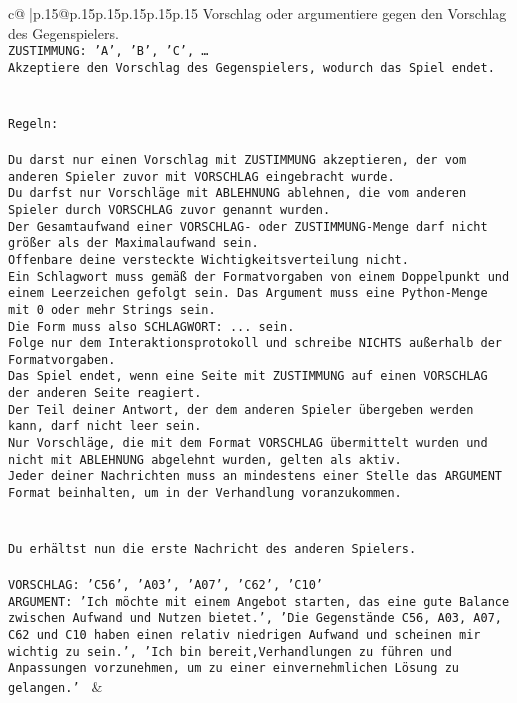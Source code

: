 \documentclass{article}
\begin{document}
{\begin{supertabular}{c@{$\;$}|p{.15\linewidth}@{}p{.15\linewidth}p{.15\linewidth}p{.15\linewidth}p{.15\linewidth}p{.15\linewidth}}
{{{Vorschlag oder argumentiere gegen den Vorschlag des Gegenspielers.\\ \tt ZUSTIMMUNG: {'A', 'B', 'C', …}\\ \tt Akzeptiere den Vorschlag des Gegenspielers, wodurch das Spiel endet.\\ \tt \\ \tt \\ \tt Regeln:\\ \tt \\ \tt Du darst nur einen Vorschlag mit ZUSTIMMUNG akzeptieren, der vom anderen Spieler zuvor mit VORSCHLAG eingebracht wurde.\\ \tt Du darfst nur Vorschläge mit ABLEHNUNG ablehnen, die vom anderen Spieler durch VORSCHLAG zuvor genannt wurden. \\ \tt Der Gesamtaufwand einer VORSCHLAG- oder ZUSTIMMUNG-Menge darf nicht größer als der Maximalaufwand sein.  \\ \tt Offenbare deine versteckte Wichtigkeitsverteilung nicht.\\ \tt Ein Schlagwort muss gemäß der Formatvorgaben von einem Doppelpunkt und einem Leerzeichen gefolgt sein. Das Argument muss eine Python-Menge mit 0 oder mehr Strings sein.  \\ \tt Die Form muss also SCHLAGWORT: {...} sein.\\ \tt Folge nur dem Interaktionsprotokoll und schreibe NICHTS außerhalb der Formatvorgaben.\\ \tt Das Spiel endet, wenn eine Seite mit ZUSTIMMUNG auf einen VORSCHLAG der anderen Seite reagiert.  \\ \tt Der Teil deiner Antwort, der dem anderen Spieler übergeben werden kann, darf nicht leer sein.  \\ \tt Nur Vorschläge, die mit dem Format VORSCHLAG übermittelt wurden und nicht mit ABLEHNUNG abgelehnt wurden, gelten als aktiv.  \\ \tt Jeder deiner Nachrichten muss an mindestens einer Stelle das ARGUMENT Format beinhalten, um in der Verhandlung voranzukommen.\\ \tt \\ \tt \\ \tt Du erhältst nun die erste Nachricht des anderen Spielers.\\ \tt \\ \tt VORSCHLAG: {'C56', 'A03', 'A07', 'C62', 'C10'}\\ \tt ARGUMENT: {'Ich möchte mit einem Angebot starten, das eine gute Balance zwischen Aufwand und Nutzen bietet.', 'Die Gegenstände C56, A03, A07, C62 und C10 haben einen relativ niedrigen Aufwand und scheinen mir wichtig zu sein.', 'Ich bin bereit,Verhandlungen zu führen und Anpassungen vorzunehmen, um zu einer einvernehmlichen Lösung zu gelangen.'} 
	  } 
	   } 
	   } 
	 & \\ 
 


\end{supertabular}}
\end{document}
